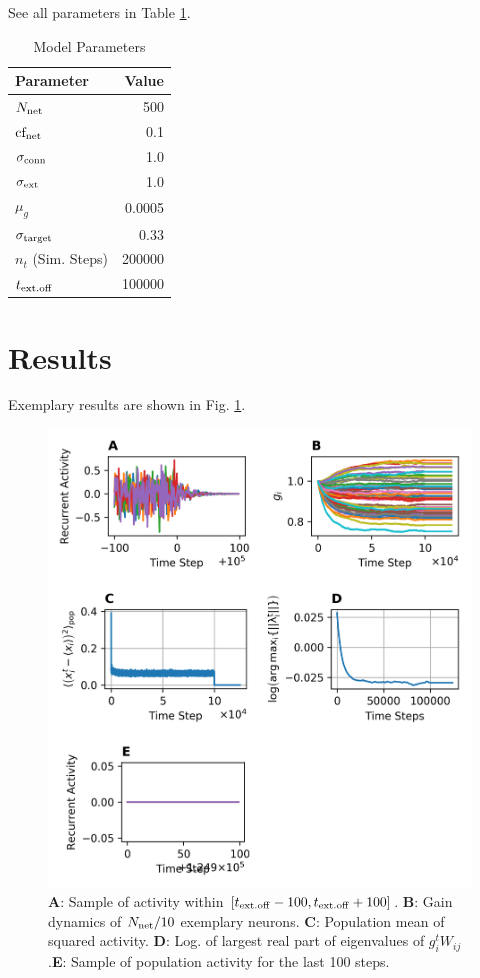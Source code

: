 \documentclass[10pt,a4paper]{article}
\begin{document}
See all parameters in Table \ref{tab:params}.
\begin{table}[h]
\caption{Model Parameters}
\centering
\vspace{5pt}
\begin{tabular}{l | r}
\textbf{Parameter} & \textbf{Value} \\
\hline
$N_{\rm net}$           & 500\\
${\rm cf_{net}}$        & 0.1\\
$\sigma_{\rm conn}$     & 1.0\\
$\sigma_{\rm ext}$		& 1.0\\
$\mu_{g}$               & 0.0005\\
$\sigma_{\rm target}$ 	& 0.33\\
$n_t$ (Sim. Steps)      & 200000\\
$t_{\rm ext.off}$       & 100000
\end{tabular}
\label{tab:params}
\end{table}
\newpage
\section{Results}
Exemplary results are shown in Fig. \ref{fig:ex_results}.

\begin{figure}[h]
\includegraphics[width=\textwidth]{../plots/im_comp.png}
\caption{{\bf A}: Sample of activity within $\left[ t_{\rm ext.off} - 100, t_{\rm ext.off} + 100 \right]$. {\bf B}: Gain dynamics of $N_{\rm net}/10$ exemplary neurons. {\bf C}: Population mean of squared activity. {\bf D}: Log. of largest real part of eigenvalues of $g_i^t W_{ij} $.{\bf E}: Sample of population activity for the last 100 steps.}
\label{fig:ex_results}
\end{figure}
\end{document}
